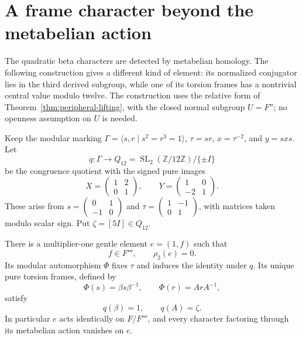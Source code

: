\section{A frame character beyond the metabelian action}
\label{sec:frame-witness}

The quadratic beta characters are detected by metabelian homology.
The following construction gives a different kind of element: its
normalized conjugator lies in the third derived subgroup, while one
of its torsion frames has a nontrivial central value modulo twelve.
The construction uses the relative form of
Theorem~\ref{thm:peripheral-lifting}, with the closed normal subgroup
$U=F''$; no openness assumption on $U$ is needed.

Keep the modular marking $\Gamma=\langle s,r\mid s^2=r^3=1\rangle$,
$\tau=sr$, $x=\tau^{-2}$, and $y=sxs$. Let
\[
 q:\Gamma\longrightarrow
 Q_{12}=\operatorname{SL}_2(\mathbb Z/12\mathbb Z)/\{\pm I\}
\]
be the congruence quotient with the signed pure images
\[
 X=\begin{pmatrix}1&2\\0&1\end{pmatrix},\qquad
 Y=\begin{pmatrix}1&0\\-2&1\end{pmatrix}.
\]
These arise from $s=\left(\begin{smallmatrix}0&1\\-1&0\end{smallmatrix}\right)$
and $\tau=\left(\begin{smallmatrix}1&-1\\0&1\end{smallmatrix}\right)$,
with matrices taken modulo scalar sign. Put $\zeta=[5I]\in Q_{12}$.

\begin{theorem}\label{thm:deep-frame-witness}
There is a multiplier-one gentle element $e=(1,f)$ such that
\[
 f\in F''',\qquad \rho_2(e)=0.
\]
Its modular automorphism $\Phi$ fixes $\tau$ and induces the identity
under $q$. Its unique pure torsion frames, defined by
\[
 \Phi(s)=\beta s\beta^{-1},\qquad
 \Phi(r)=ArA^{-1},
\]
satisfy
\[
 q(\beta)=1,\qquad q(A)=\zeta.
\]
In particular $e$ acts identically on $F/F'''$, and every character
factoring through its metabelian action vanishes on $e$.
\end{theorem}

